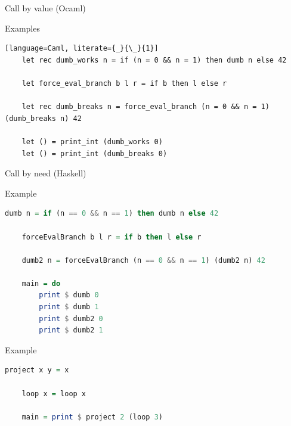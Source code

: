 \documentclass[10pt]{beamer}
\begin{document}
\begin{frame}[fragile]{Call by value (Ocaml)}
  \begin{alertblock}{Examples}
  \begin{lstlisting}[language=Caml, literate={_}{\_}{1}]
    let rec dumb_works n = if (n = 0 && n = 1) then dumb n else 42

    let force_eval_branch b l r = if b then l else r

    let rec dumb_breaks n = force_eval_branch (n = 0 && n = 1) (dumb_breaks n) 42

    let () = print_int (dumb_works 0)
    let () = print_int (dumb_breaks 0)

  \end{lstlisting}
  \end{alertblock}
\end{frame}


\begin{frame}[fragile]{Call by need (Haskell)}
  \begin{alertblock}{Example}
  \begin{lstlisting}[language=Haskell]
    dumb n = if (n == 0 && n == 1) then dumb n else 42

    forceEvalBranch b l r = if b then l else r

    dumb2 n = forceEvalBranch (n == 0 && n == 1) (dumb2 n) 42

    main = do
        print $ dumb 0
        print $ dumb 1
        print $ dumb2 0
        print $ dumb2 1

  \end{lstlisting}
  \end{alertblock}

  \pause

  \begin{alertblock}{Example}
  \begin{lstlisting}[language=Haskell]
    project x y = x

    loop x = loop x

    main = print $ project 2 (loop 3)
  \end{lstlisting}
  \end{alertblock}


\end{frame}
\end{document}
